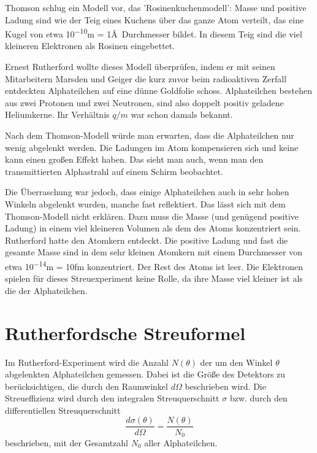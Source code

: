 Thomson schlug ein Modell vor, das 'Rosinenkuchenmodell': Masse und positive Ladung sind wie der Teig eines Kuchens über das ganze Atom verteilt, das eine Kugel von etwa \si{10^{-10}}{m} = 1\AA\ Durchmesser bildet. In diesem Teig sind die viel kleineren Elektronen als Rosinen eingebettet.

Ernest Rutherford wollte dieses Modell überprüfen, indem er mit seinen Mitarbeitern Marsden und Geiger die kurz zuvor beim radioaktiven Zerfall entdeckten Alphateilchen auf eine dünne Goldfolie schoss. Alphateilchen bestehen aus zwei Protonen und zwei Neutronen, sind also doppelt positiv geladene Heliumkerne. Ihr Verhältnis $q/m$ war schon damals bekannt.

Nach dem Thomson-Modell würde man erwarten, dass die Alphateilchen nur wenig abgelenkt werden. Die Ladungen im Atom kompensieren sich und keine kann einen großen Effekt haben. Das sieht man auch, wenn man den transmittierten Alphastrahl auf einem Schirm beobachtet.

Die Überraschung war jedoch, dass einige Alphateilchen auch in sehr hohen Winkeln abgelenkt wurden, manche fast reflektiert. Das lässt sich mit dem Thomson-Modell nicht erklären. Dazu muss die Masse (und genügend positive Ladung) in einem viel kleineren Volumen als dem des Atoms konzentriert sein. Rutherford hatte den Atomkern entdeckt. Die positive Ladung und fast die gesamte Masse sind in dem sehr kleinen Atomkern mit einem Durchmesser von etwa \si{10^{-14}}{m} = \si{10}{fm} konzentriert. Der Rest des Atoms ist leer. Die Elektronen spielen für dieses Streuexperiment keine Rolle, da ihre Masse viel kleiner ist als die der Alphateilchen.

\section{Rutherfordsche Streuformel}

Im Rutherford-Experiment wird die Anzahl $N(\theta)$ der um den Winkel $\theta$ abgelenkten Alphateilchen gemessen. Dabei ist die Größe des Detektors zu berücksichtigen, die durch den Raumwinkel $d\Omega$ beschrieben wird. Die Streueffizienz wird durch den integralen Streuquerschnitt $\sigma$ bzw. durch den differentiellen Streuquerschnitt  
\begin{equation}
    \frac{d \sigma(\theta)}{d\Omega} = \frac{N(\theta)}{N_0}
\end{equation}
beschrieben, mit der Gesamtzahl $N_0$ aller Alphateilchen.

